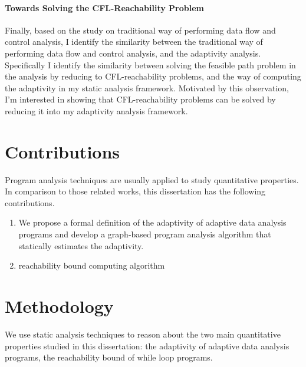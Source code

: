    \paragraph*{Towards Solving the CFL-Reachability Problem}
Finally, based on the study on traditional way of performing data flow and control analysis,
I identify the similarity between the traditional way of performing data flow and control analysis, and the 
   adaptivity analysis.  
   Specifically I identify the similarity between 
   solving the feasible path problem in the analysis by reducing to CFL-reachability problems,
   and the way of computing the adaptivity in my static analysis framework.
   Motivated by this observation, 
   I'm interested in showing that
   CFL-reachability problems can be solved by reducing it into my adaptivity analysis framework.

   \section{Contributions}

   Program analysis techniques are usually applied to study quantitative properties. In comparison to those related works, this dissertation has the following contributions.
   
   \begin{enumerate}
   
   \item We propose a formal definition of the adaptivity of adaptive data analysis programs and develop a graph-based program analysis algorithm that statically estimates the adaptivity.
   \item reachability bound computing algorithm
   \end{enumerate}

\section{Methodology}
We use static analysis techniques to reason about the two main quantitative properties studied in this dissertation: 
the adaptivity of adaptive data analysis programs,
the reachability bound of while loop programs. 

